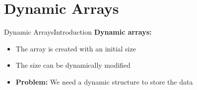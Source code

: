 \section{Dynamic Arrays}


\begin{frame}{Dynamic Arrays}{Introduction}
  \textbf{Dynamic arrays:}
  \begin{itemize}
    \item
      The array is created with an initial size
    \item
      The size can be dynamically modified
    \item
      \textbf{Problem:}
      We need a dynamic structure to store the data
  \end{itemize}
\end{frame}








